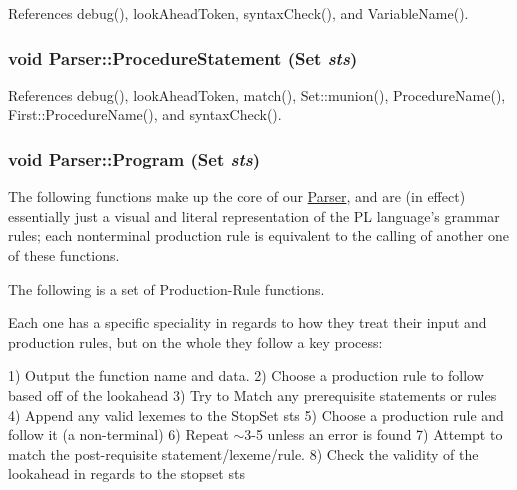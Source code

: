 References debug(), lookAheadToken, syntaxCheck(), and VariableName().

\hypertarget{classParser_a7a6c6b63d49340ff06c453ce8954eeff}{
\subsubsection[{ProcedureStatement}]{\setlength{\rightskip}{0pt plus 5cm}void Parser::ProcedureStatement ({\bf Set} {\em sts})}}
\label{classParser_a7a6c6b63d49340ff06c453ce8954eeff}


References debug(), lookAheadToken, match(), Set::munion(), ProcedureName(), First::ProcedureName(), and syntaxCheck().

\hypertarget{classParser_a068fd2e519704d6fbaf9c8ecb3469e49}{
\subsubsection[{Program}]{\setlength{\rightskip}{0pt plus 5cm}void Parser::Program ({\bf Set} {\em sts})}}
\label{classParser_a068fd2e519704d6fbaf9c8ecb3469e49}


The following functions make up the core of our \hyperlink{classParser}{Parser}, and are (in effect) essentially just a visual and literal representation of the PL language's grammar rules; each nonterminal production rule is equivalent to the calling of another one of these functions. 

The following is a set of Production-\/Rule functions.

Each one has a specific speciality in regards to how they treat their input and production rules, but on the whole they follow a key process:

1) Output the function name and data. 2) Choose a production rule to follow based off of the lookahead 3) Try to Match any prerequisite statements or rules 4) Append any valid lexemes to the StopSet sts 5) Choose a production rule and follow it (a non-\/terminal) 6) Repeat $\sim$3-\/5 unless an error is found 7) Attempt to match the post-\/requisite statement/lexeme/rule. 8) Check the validity of the lookahead in regards to the stopset sts

